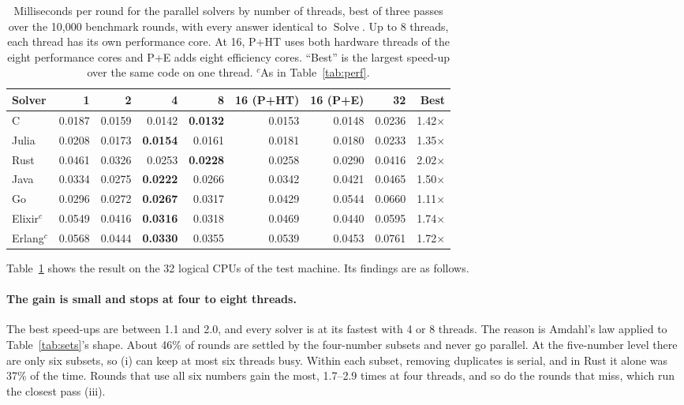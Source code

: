\documentclass[11pt,a4paper]{article}
\theoremstyle{definition}
\theoremstyle{remark}
\begin{document}
\begin{table}[ht]
\centering
\small
\begin{tabular}{@{}lrrrrrrrr@{}}
\toprule
Solver & 1 & 2 & 4 & 8 & 16 (P+HT) & 16 (P+E) & 32 & Best \\ \midrule
C       & 0.0187 & 0.0159 & 0.0142 & \textbf{0.0132} & 0.0153 & 0.0148 & 0.0236 & 1.42$\times$ \\
Julia   & 0.0208 & 0.0173 & \textbf{0.0154} & 0.0161 & 0.0181 & 0.0180 & 0.0233 & 1.35$\times$ \\
Rust    & 0.0461 & 0.0326 & 0.0253 & \textbf{0.0228} & 0.0258 & 0.0290 & 0.0416 & 2.02$\times$ \\
Java    & 0.0334 & 0.0275 & \textbf{0.0222} & 0.0266 & 0.0342 & 0.0421 & 0.0465 & 1.50$\times$ \\
Go      & 0.0296 & 0.0272 & \textbf{0.0267} & 0.0317 & 0.0429 & 0.0544 & 0.0660 & 1.11$\times$ \\
Elixir$^c$ & 0.0549 & 0.0416 & \textbf{0.0316} & 0.0318 & 0.0469 & 0.0440 & 0.0595 & 1.74$\times$ \\
Erlang$^c$ & 0.0568 & 0.0444 & \textbf{0.0330} & 0.0355 & 0.0539 & 0.0453 & 0.0761 & 1.72$\times$ \\ \bottomrule
\end{tabular}
\caption{Milliseconds per round for the parallel solvers by number of threads, best of three passes over
the 10{,}000 benchmark rounds, with every answer identical to $\operatorname{Solve}$. Up to 8 threads, each
thread has its own performance core. At 16, P+HT uses both hardware threads of the eight performance cores
and P+E adds eight efficiency cores. ``Best'' is the largest speed-up over the same code on one thread.
$^c$As in Table~\ref{tab:perf}.}\label{tab:scale}
\end{table}

Table~\ref{tab:scale} shows the result on the 32 logical CPUs of the test machine. Its findings are as follows.

\paragraph{The gain is small and stops at four to eight threads.}
The best speed-ups are between 1.1 and 2.0, and every solver is at its fastest with 4 or 8 threads. The
reason is Amdahl's law applied to Table~\ref{tab:sets}'s shape. About 46\% of rounds are settled by the
four-number subsets and never go parallel. At the five-number level there are only six subsets, so (i) can
keep at most six threads busy. Within each subset, removing duplicates is serial, and in Rust it alone
was 37\% of the time. Rounds that use all six numbers gain the most, 1.7--2.9 times at four threads, and so
do the rounds that miss, which run the closest pass (iii).
\end{document}
